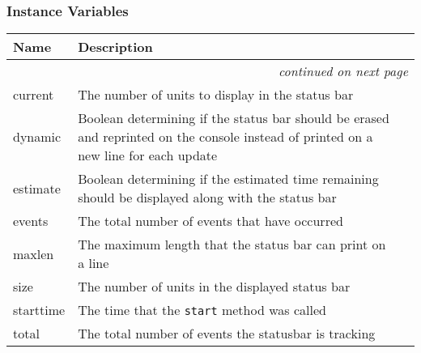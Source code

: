 
  \subsubsection{Instance Variables}

    \vspace{-1cm}
\hspace{\varindent}\begin{longtable}{|p{\varnamewidth}|p{\vardescrwidth}|l}
\cline{1-2}
\cline{1-2} \centering \textbf{Name} & \centering \textbf{Description}& \\
\cline{1-2}
\endhead\cline{1-2}\multicolumn{3}{r}{\small\textit{continued on next page}}\\\endfoot\cline{1-2}
\endlastfoot\raggedright c\-u\-r\-r\-e\-n\-t\- & The number of units to display in the status bar&\\
\cline{1-2}
\raggedright d\-y\-n\-a\-m\-i\-c\- & Boolean determining if the status bar should be erased and 
          reprinted on the console instead of printed on a new line for 
          each update&\\
\cline{1-2}
\raggedright e\-s\-t\-i\-m\-a\-t\-e\- & Boolean determining if the estimated time remaining should be 
          displayed along with the status bar&\\
\cline{1-2}
\raggedright e\-v\-e\-n\-t\-s\- & The total number of events that have occurred&\\
\cline{1-2}
\raggedright m\-a\-x\-l\-e\-n\- & The maximum length that the status bar can print on a line&\\
\cline{1-2}
\raggedright s\-i\-z\-e\- & The number of units in the displayed status bar&\\
\cline{1-2}
\raggedright s\-t\-a\-r\-t\-t\-i\-m\-e\- & The time that the \texttt{start} method was called&\\
\cline{1-2}
\raggedright t\-o\-t\-a\-l\- & The total number of events the statusbar is tracking&\\
\cline{1-2}
\end{longtable}


